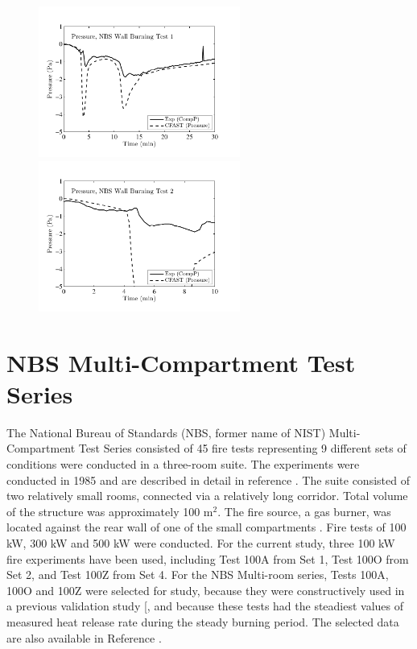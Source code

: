 \begin{figure}[p]
\begin{center}
\includegraphics[width=2.6in]{FIGURES/NBS/1rwall1_Pressure} \\
\includegraphics[width=2.6in]{FIGURES/NBS/1rwall2_Pressure} 
\end{center}
\end{figure}

\clearpage

\section{NBS Multi-Compartment Test Series}

The National Bureau of Standards (NBS, former name of NIST) Multi-Compartment Test Series consisted of 45 fire tests representing 9 different sets of conditions were conducted in a three-room suite.  The experiments were conducted in 1985 and are described in detail in reference \cite{Peacock:1988}.  The suite consisted of two relatively small rooms, connected via a relatively long corridor. Total volume of the structure was approximately 100 m$^2$. The fire source, a gas burner, was located against the rear wall of one of the small compartments . Fire tests of 100 kW, 300 kW and 500 kW were conducted. For the current  study, three 100 kW fire experiments have been used, including Test 100A from Set 1, Test 100O from Set 2, and Test 100Z from Set 4. For the NBS Multi-room series, Tests 100A, 100O and 100Z were selected for study, because they were constructively used in a previous validation study [\cite{EPRI}, and because these tests had  the steadiest values of measured heat release rate during the steady burning period. The selected data are also available in Reference \cite{EPRI}. 

